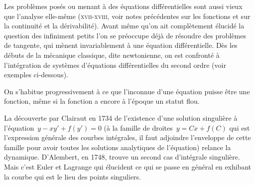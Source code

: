\medskip
\begin{histoire}%
Les problèmes posés ou menant à des équations différentielles sont aussi vieux que l'analyse elle-même (\textsc{xvii}-\textsc{xviii}, voir notes précédentes sur les fonctions et sur la continuité et la dérivabilité). Avant même qu'on ait complètement élucidé la question des infiniment petits l'on se préoccupe déjà de résoudre des problèmes de tangente, qui mènent invariablement à une équation différentielle. Dès les débuts de la mécanique classique, dite newtonienne, on est confronté à l'intégration de systèmes d'équations différentielles du second ordre (voir exemples ci-dessous).

\medskip
On s'habitue progressivement à ce que l'inconnue d'une équation puisse être une fonction, même si la fonction a encore à l'époque un statut flou. 

\bigskip
{}

\medskip
La découverte par Clairaut en 1734 de l'existence d'une solution singulière à l'équation~$y - xy' + f(y') = 0$ (à la famille de droites~$y = Cx + f(C)$ qui est l'expression générale des courbes intégrales, il faut adjoindre l'enveloppe de cette famille pour avoir toutes les solutions analytiques de l'équation) relance la dynamique. D'Alembert, en 1748, trouve un second cas d'intégrale singulière. Mais c'est Euler et Lagrange qui élucident ce qui se passe en général en exhibant la courbe qui est le lieu des points singuliers.


\end{histoire}
